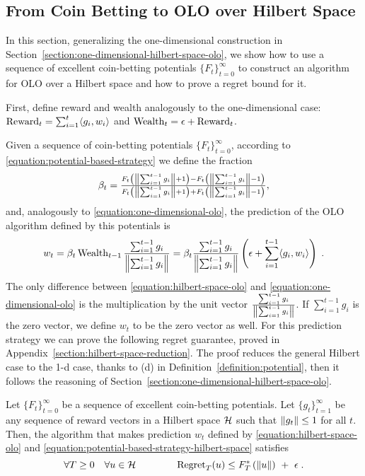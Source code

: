 \subsection{From Coin Betting to OLO over Hilbert Space}
\label{section:reduction_hilbert}

In this section, generalizing the
one-dimensional construction in
Section~\ref{section:one-dimensional-hilbert-space-olo}, we show how to use a sequence of excellent coin-betting
potentials $\{F_t\}_{t=0}^\infty$ to construct an algorithm for \ac{OLO} over a
Hilbert space and how to prove a regret bound for it.

First, define reward and wealth analogously to the one-dimensional case:
$\operatorname{Reward}_t = \sum_{i=1}^t \langle g_i, w_i \rangle$ and $\operatorname{Wealth}_t = \epsilon +
\operatorname{Reward}_t$.

Given a sequence of coin-betting potentials $\{F_t\}_{t=0}^\infty$, according
to \eqref{equation:potential-based-strategy} we define the fraction
\begin{equation}
\label{equation:potential-based-strategy-hilbert-space}
\beta_t = \tfrac{F_t \left(\left\|{\sum_{i=1}^{t-1} g_i}\right\| + 1\right) - F_t\left(\left\|{\sum_{i=1}^{t-1} g_i}\right\| - 1 \right)}{F_t\left(\left\|{\sum_{i=1}^{t-1} g_i}\right\| + 1 \right) + F_t\left(\left\|{\sum_{i=1}^{t-1} g_i}\right\| - 1 \right)},
\end{equation}
and, analogously to \eqref{equation:one-dimensional-olo}, the prediction of the OLO algorithm
defined by this potentials is
\begin{equation}
\label{equation:hilbert-space-olo}
w_t = \beta_t \operatorname{Wealth}_{t-1} \frac{\sum_{i=1}^{t-1} g_i}{\left\|{\sum_{i=1}^{t-1} g_i}\right\|}
= \beta_t \frac{\sum_{i=1}^{t-1} g_i}{\left\|{\sum_{i=1}^{t-1} g_i}\right\|} \left(\epsilon+ \sum_{i=1}^{t-1} \langle g_i, w_i\rangle \right) \; .
\end{equation}
The only difference between \eqref{equation:hilbert-space-olo} and
\eqref{equation:one-dimensional-olo} is the multiplication by the unit vector
$\frac{\sum_{i=1}^{t-1} g_i}{\left\|{\sum_{i=1}^{t-1} g_i}\right\|}$. If $\sum_{i=1}^{t-1}
g_i$ is the zero vector, we define $w_t$ to be the zero vector as well.  For this
prediction strategy we can prove the following regret guarantee, proved in
Appendix~\ref{section:hilbert-space-reduction}.  The proof reduces the general
Hilbert case to the 1-d case, thanks to (d) in
Definition~\ref{definition:potential}, then it follows the reasoning of
Section~\ref{section:one-dimensional-hilbert-space-olo}.
%
\begin{theorem}
\label{theorem:hilbert-space-olo-regret-bound}
Let $\{F_t\}_{t=0}^\infty$ be a sequence of excellent coin-betting potentials.
Let $\{g_t\}_{t=1}^\infty$ be any sequence of reward vectors in a Hilbert space
$\mathcal{H}$ such that $\left\|{g_t}\right\| \le 1$ for all $t$. Then, the algorithm that makes
prediction $w_t$ defined by \eqref{equation:hilbert-space-olo} and
\eqref{equation:potential-based-strategy-hilbert-space} satisfies
\[
\forall T \ge 0 \quad
\forall u \in \mathcal{H} \qquad \qquad
\operatorname{Regret}_T(u) \le F_T^*\left(\left\|{u}\right\| \right) \ + \ \epsilon \; .
\]
\end{theorem}
